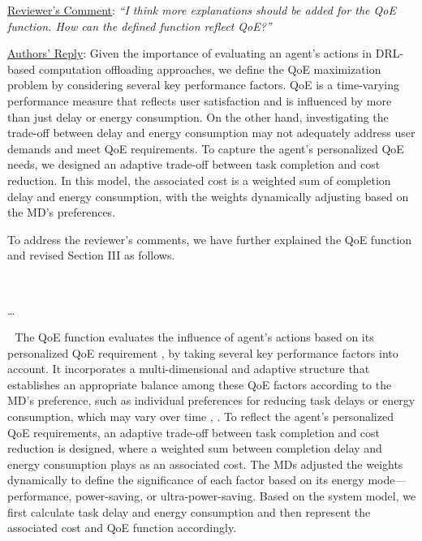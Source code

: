 \documentclass[12pt,draftclsnofoot,onecolumn]{IEEEtran}
\newcommand{\rev}[1]{{\color{blue}#1}} %
\newcommand{\rev}[1]{#1}
\newenvironment{my}[2]%
{\begin{list}{}%
{\setlength{\rightmargin}{#1}\setlength{\leftmargin}{#2}}%


 \item[]{}

} {\end{list}}
\begin{document}
\begin{enumerate}
\begin{my}{1cm}{1cm}
\end{my}

\vspace{6mm}




	\item \underline{Reviewer's Comment}: 
	\textit{``I think more explanations should be added for the QoE function. How can the defined function reflect QoE?''} \newline
	
	\underline{Authors' Reply}: Given the importance of evaluating an agent's actions in DRL-based computation offloading approaches, we define the QoE maximization problem by considering several key performance factors. QoE is a time-varying performance measure that reflects user satisfaction and is influenced by more than just delay or energy consumption. On the other hand, investigating the trade-off between delay and energy consumption may not adequately address user demands and meet QoE requirements. To capture the agent’s personalized QoE needs, we designed an adaptive trade-off between task completion and cost reduction. In this model, the associated cost is a weighted sum of completion delay and energy consumption, with the weights dynamically adjusting based on the MD's preferences.\vspace{2mm}
	
	To address the reviewer's comments, we have further explained the QoE function and revised Section III as follows.
	
	
	
			\begin{my}{1cm}{1cm}
		\rev{
			{\ 
				
				\dots 
				
\,\,\,\,The QoE function evaluates the influence of agent's actions based on its personalized QoE requirement \cite{wang2017qoe}, by taking several key performance factors into account. It incorporates a multi-dimensional and adaptive structure that establishes an appropriate balance among these QoE factors according to the MD's preference, such as individual preferences for reducing task delays or energy consumption, which may vary over time \cite{wang2019intelligent}, \cite{mehrabi2019energy}. To reflect the agent’s personalized QoE requirements, an adaptive trade-off between task completion and cost reduction is designed, where a weighted sum between completion delay and energy consumption plays as an associated cost. The MDs adjusted the weights dynamically to define the significance of each factor based on its energy mode—performance, power-saving, or ultra-power-saving. 
Based on the system model, we first calculate task delay and energy consumption and then represent the associated cost and QoE function accordingly.
								
}}
\end{my}
\end{enumerate}
\end{document}
